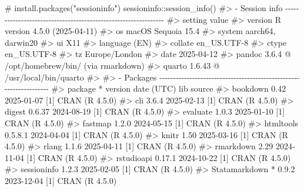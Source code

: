 \documentclass[
  10pt,
  a4paper,
]{book}
\newenvironment{Shaded}{\begin{snugshade}}{\end{snugshade}}
\newcommand{\CommentTok}[1]{\textcolor[rgb]{0.37,0.37,0.37}{#1}}
\newcommand{\FunctionTok}[1]{\textcolor[rgb]{0.28,0.35,0.67}{#1}}
\newcommand{\NormalTok}[1]{\textcolor[rgb]{0.00,0.46,0.62}{#1}}
\newcommand{\SpecialCharTok}[1]{\textcolor[rgb]{0.37,0.37,0.37}{#1}}
\begin{document}
\begin{Shaded}
\begin{Highlighting}[]
\CommentTok{\# install.packages("sessioninfo")}
\NormalTok{sessioninfo}\SpecialCharTok{::}\FunctionTok{session\_info}\NormalTok{()}
\CommentTok{\#\textgreater{} {-} Session info {-}{-}{-}{-}{-}{-}{-}{-}{-}{-}{-}{-}{-}{-}{-}{-}{-}{-}{-}{-}{-}{-}{-}{-}{-}{-}{-}{-}{-}{-}{-}{-}{-}{-}{-}{-}{-}{-}{-}{-}{-}{-}{-}{-}{-}{-}{-}{-}{-}{-}{-}{-}{-}{-}{-}{-}{-}{-}{-}{-}{-}{-}{-}}
\CommentTok{\#\textgreater{}  setting  value}
\CommentTok{\#\textgreater{}  version  R version 4.5.0 (2025{-}04{-}11)}
\CommentTok{\#\textgreater{}  os       macOS Sequoia 15.4}
\CommentTok{\#\textgreater{}  system   aarch64, darwin20}
\CommentTok{\#\textgreater{}  ui       X11}
\CommentTok{\#\textgreater{}  language (EN)}
\CommentTok{\#\textgreater{}  collate  en\_US.UTF{-}8}
\CommentTok{\#\textgreater{}  ctype    en\_US.UTF{-}8}
\CommentTok{\#\textgreater{}  tz       Europe/London}
\CommentTok{\#\textgreater{}  date     2025{-}04{-}12}
\CommentTok{\#\textgreater{}  pandoc   3.6.4 @ /opt/homebrew/bin/ (via rmarkdown)}
\CommentTok{\#\textgreater{}  quarto   1.6.43 @ /usr/local/bin/quarto}
\CommentTok{\#\textgreater{} }
\CommentTok{\#\textgreater{} {-} Packages {-}{-}{-}{-}{-}{-}{-}{-}{-}{-}{-}{-}{-}{-}{-}{-}{-}{-}{-}{-}{-}{-}{-}{-}{-}{-}{-}{-}{-}{-}{-}{-}{-}{-}{-}{-}{-}{-}{-}{-}{-}{-}{-}{-}{-}{-}{-}{-}{-}{-}{-}{-}{-}{-}{-}{-}{-}{-}{-}{-}{-}{-}{-}{-}{-}{-}{-}}
\CommentTok{\#\textgreater{}  package       * version date (UTC) lib source}
\CommentTok{\#\textgreater{}  bookdown        0.42    2025{-}01{-}07 [1] CRAN (R 4.5.0)}
\CommentTok{\#\textgreater{}  cli             3.6.4   2025{-}02{-}13 [1] CRAN (R 4.5.0)}
\CommentTok{\#\textgreater{}  digest          0.6.37  2024{-}08{-}19 [1] CRAN (R 4.5.0)}
\CommentTok{\#\textgreater{}  evaluate        1.0.3   2025{-}01{-}10 [1] CRAN (R 4.5.0)}
\CommentTok{\#\textgreater{}  fastmap         1.2.0   2024{-}05{-}15 [1] CRAN (R 4.5.0)}
\CommentTok{\#\textgreater{}  htmltools       0.5.8.1 2024{-}04{-}04 [1] CRAN (R 4.5.0)}
\CommentTok{\#\textgreater{}  knitr           1.50    2025{-}03{-}16 [1] CRAN (R 4.5.0)}
\CommentTok{\#\textgreater{}  rlang           1.1.6   2025{-}04{-}11 [1] CRAN (R 4.5.0)}
\CommentTok{\#\textgreater{}  rmarkdown       2.29    2024{-}11{-}04 [1] CRAN (R 4.5.0)}
\CommentTok{\#\textgreater{}  rstudioapi      0.17.1  2024{-}10{-}22 [1] CRAN (R 4.5.0)}
\CommentTok{\#\textgreater{}  sessioninfo     1.2.3   2025{-}02{-}05 [1] CRAN (R 4.5.0)}
\CommentTok{\#\textgreater{}  Statamarkdown * 0.9.2   2023{-}12{-}04 [1] CRAN (R 4.5.0)}

\end{Highlighting}
\end{Shaded}
\end{document}
